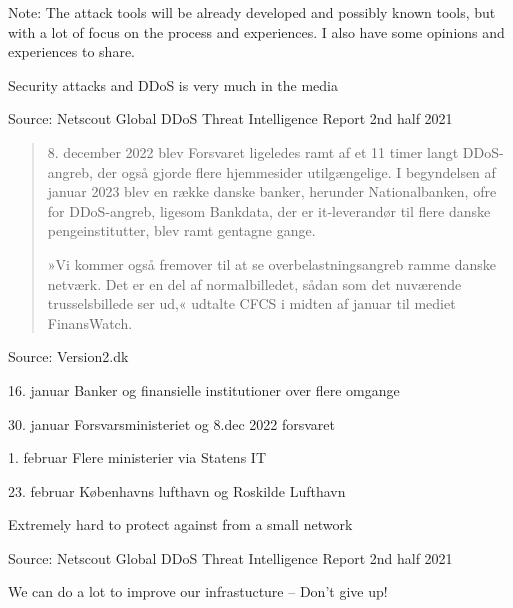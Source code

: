 \documentclass[Screen16to9,17pt]{foils}
\begin{document}
Note: The attack tools will be already developed and possibly known tools, but with a lot of focus on the process and experiences. I also have some opinions and experiences to share.


Security attacks and DDoS is very much in the media

{\footnotesize Source: Netscout Global DDoS Threat Intelligence Report 2nd half 2021\\
}



\begin{quote}
8. december 2022 blev Forsvaret ligeledes ramt af et 11 timer langt DDoS-angreb, der også gjorde flere hjemmesider utilgængelige. I begyndelsen af januar 2023 blev en række danske banker, herunder Nationalbanken, ofre for DDoS-angreb, ligesom Bankdata, der er it-leverandør til flere danske pengeinstitutter, blev ramt gentagne gange.

»Vi kommer også fremover til at se overbelastningsangreb ramme danske netværk. Det er en del af normalbilledet, sådan som det nuværende trusselsbillede ser ud,« udtalte CFCS i midten af januar til mediet FinansWatch.
\end{quote}

Source: Version2.dk

\begin{list2}
\item 16. januar Banker og finansielle institutioner over flere omgange
\item 30. januar Forsvarsministeriet og 8.dec 2022 forsvaret
\item 1. februar Flere ministerier via Statens IT
\item 23. februar Københavns lufthavn og Roskilde Lufthavn
\end{list2}


Extremely hard to protect against from a small network


{\footnotesize Source: Netscout Global DDoS Threat Intelligence Report 2nd half 2021\\
}

We can do a lot to improve our infrastucture -- Don't give up!
\end{document}
